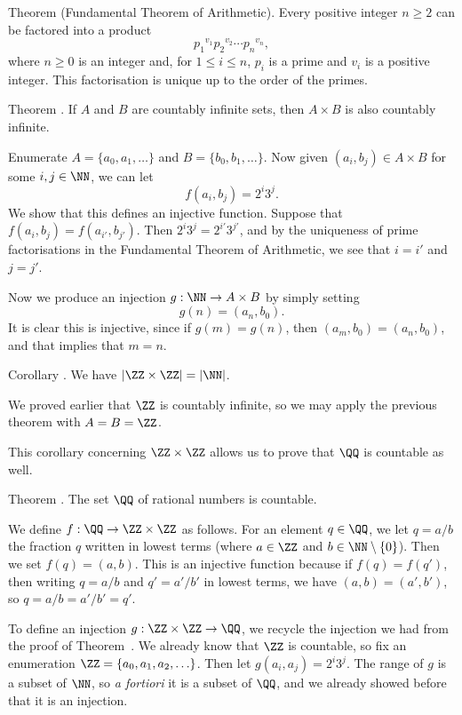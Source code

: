 \parenproclaim Theorem {\advthm} (Fundamental Theorem of Arithmetic). Every positive
integer $n\ge 2$ can be factored into a product
$${p_1}^{v_1} {p_2}^{v_2}\cdots {p_n}^{v_n},$$
where $n\ge 0$ is an integer and, for $1\le i\le n$, $p_i$ is a prime and $v_i$ is a positive integer.
This factorisation is unique up to the order of the primes.\slug

\edef\thmcartesiancountable{\the\thmcount}
\proclaim Theorem \advthm. If $A$ and $B$ are countably infinite sets,
then $A\times B$ is also countably infinite.

\proof
Enumerate $A = \{a_0, a_1, \ldots\}$ and $B = \{b_0, b_1, \ldots\}$. Now given
$(a_i, b_j)\in A\times B$ for some $i,j\in \NN$, we can let
$$f(a_i, b_j) = 2^i3^j.$$
We show that this defines an injective function. Suppose that $f(a_i, b_j) = f(a_{i'}, b_{j'}).$
Then $2^i3^j = 2^{i'} 3^{j'}$, and by the uniqueness of prime factorisations in the Fundamental
Theorem of Arithmetic, we see that $i = i'$ and $j=j'$.

Now we produce an injection $g : \NN\to A\times B$ by simply setting
$$g(n) = (a_n, b_0).$$
It is clear this is injective, since if $g(m) = g(n)$, then $(a_m, b_0) = (a_n, b_0)$, and
that implies that $m=n$.\slug

\edef\corzedtwocountable{\the\thmcount}
\proclaim Corollary \advthm. We have $|\ZZ\times \ZZ| = |\NN|$.

\proof
We proved earlier that $\ZZ$ is countably infinite, so we may apply the previous theorem with $A = B = \ZZ$.\slug

This corollary concerning $\ZZ\times \ZZ$ allows us to prove that $\QQ$ is countable as well.

\proclaim Theorem \advthm. The set $\QQ$ of rational numbers is countable.

\proof We define $f:\QQ\to \ZZ\times \ZZ$ as follows. For an element $q\in \QQ$, we let $q = a/b$ the fraction $q$
written in lowest terms (where $a\in \ZZ$ and $b\in \NN\setminus\{0\}$). Then we set $f(q) = (a,b)$.
This is an injective function because if $f(q) = f(q')$, then writing $q = a/b$ and $q' = a'/b'$ in lowest
terms, we have $(a,b) = (a',b')$, so $q = a/b = a'/b' = q'$.

To define an injection $g: \ZZ\times \ZZ\to \QQ$, we recycle the injection we had from the proof
of Theorem~{\thmcartesiancountable}. We already know that $\ZZ$ is countable, so fix an enumeration
$\ZZ = \{a_0, a_1, a_2, \ldots\}$. Then let $g(a_i, a_j) = 2^i 3^j$. The range of $g$ is a subset of $\NN$,
so {\it a fortiori} it is a subset of $\QQ$, and we already showed before that it is an injection.

